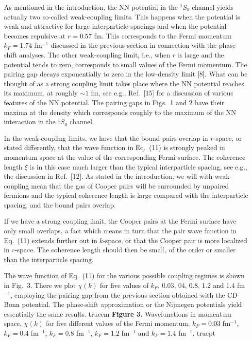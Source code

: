 As mentioned in the introduction, 
the NN potential in the $^1S_0$ channel yields actually  
two so-called weak-coupling limits. This happens when the potential is weak 
and attractive for large interparticle
spacings and when the potential becomes repulsive at $r=0.57$ fm. 
This corresponds to the Fermi momentum $k_F=1.74$ fm$^{-1}$ discussed
in the previous section in connection with the phase shift analyses.
The other weak-coupling limit, i.e., when $r$ is large and the potential
tends to zero, corresponds to small values of the Fermi momentum.
The pairing gap decays exponentially to zero in the low-density
limit [8]. 
What can be thought of as a 
strong coupling limit takes place where the NN potential
reaches its maximum, at roughly $\sim 1$ fm, see e.g., Ref.\ [15] for 
a discussion of various features of the NN potential. The pairing
gaps in Figs.\ 1 and 2 have their maxima at the density 
which corresponds roughly to the maximum of the NN interaction in the  
$^1S_0$ channel.

In the weak-coupling limits, we have that the bound pairs overlap in $r$-space,
or stated differently, 
that the wave function in Eq.\ (11) is strongly peaked in momentum
space at the value of the corresponding Fermi surface. 
The coherence length $\xi$ is in this case much larger than the
typical interparticle spacing, see
e.g., the discussion in Ref.\ [12]. 
As stated in the introduction, we will with weak-coupling mean
that the gas of Cooper pairs will be surrounded by unpaired fermions and
the typical coherence length is large compared with the interparticle
spacing, and the bound pairs overlap. 

If we have a strong coupling limit, the Cooper pairs at the Fermi surface
have only small 
overlaps, a fact which means in turn that the pair wave function in Eq.\ (11)
extends further out in $k$-space, or that the Cooper pair 
is more localized in $r$-space. The coherence length should then be small, 
of the order or smaller than the interparticle spacing.
 
The wave function of Eq.\ (11) 
for the various possible coupling regimes
is shown in Fig.\ 3. There we plot $\chi({ k})$ for five values
of $k_F$, 0.03, 04, 0.8, 1.2 and 1.4 fm$^{-1}$, employing the pairing gap
from the previous section obtained with the CD-Bonn potential. The phase-shift
approximation or the Nijmegen potentials yield essentially the same results.
\vfill\eject
\topinsert
{} truecm
\endinsert
\noindent
{\bf Figure 3.} Wavefunctions in momentum space, $\chi (k)$ 
         for five different values of the Fermi momentum, 
         $k_F=0.03$ fm$^{-1}$, $k_F=0.4$ fm$^{-1}$, $k_F=0.8$ fm$^{-1}$, 
         $k_F=1.2$ fm$^{-1}$ and $k_F=1.4$ fm$^{-1}$.
 truept
\noindent
 

